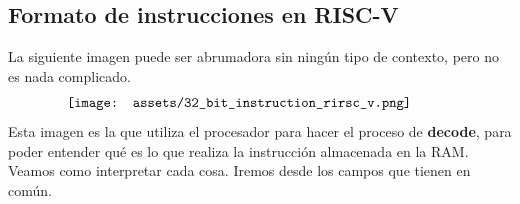 \documentclass[10pt,a4paper]{article}
\begin{document}
\subsection*{Formato de instrucciones en RISC-V}
La siguiente imagen puede ser abrumadora sin ningún tipo de contexto, pero no es nada complicado. \\
\[\begin{minipage}[b]{0.8\textwidth}
    \texttt{[image: assets/32\_bit\_instruction\_rirsc\_v.png]}
    \label{fig:32_bit_instruction_rirsc_v}
\end{minipage}\]
Esta imagen es la que utiliza el procesador para hacer el proceso de \textbf{decode}, para poder entender qué es lo que realiza la instrucción almacenada en la RAM. Veamos como interpretar cada cosa. Iremos desde los campos que tienen en común. \\
\end{document}
